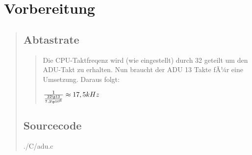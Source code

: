 \section{Vorbereitung}
\begin{quote}
    \subsection{Abtastrate}
    \begin{quote}
        
        Die CPU-Taktfreqenz wird (wie eingestellt) durch 32 geteilt um den ADU-Takt zu erhalten. Nun braucht der ADU 13 Takte fÃ¼r eine Umsetzung.
        Daraus folgt:
        
        $\frac{1}{\frac{32 \p 13}{7,3 \p 10^6}} \approx 17,5 kHz$
        
    \end{quote}

    \subsection{Sourcecode}
    
        {./C/adu.c}
            


    
    
\end{quote}







\bq

\eq



